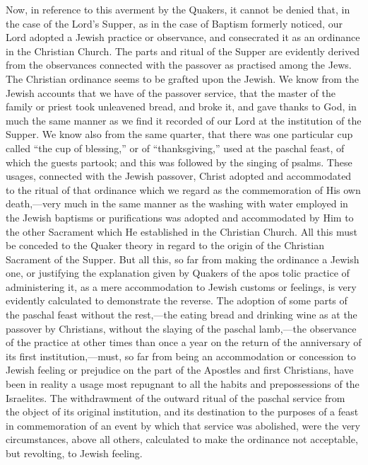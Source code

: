 \documentclass[]{book}
\begin{document}
Now, in reference to this averment by the Quakers, it cannot be denied that, in the case of the Lord's Supper, as in the case of Baptism formerly noticed, our Lord adopted a Jewish practice or observance, and consecrated it as an ordinance in the Christian Church. The parts and ritual of the Supper are evidently derived from the observances connected with the passover as practised among the Jews. The Christian ordinance seems to be grafted upon the Jewish. We know from the Jewish accounts that we have of the passover service, that the master of the family or priest took unleavened bread, and broke it, and gave thanks to God, in much the same manner as we find it recorded of our Lord at the institution of the Supper. We know also from the same quarter, that there was one particular cup called ``the cup of blessing,'' or of ``thanksgiving,'' used at the paschal feast, of which the guests partook; and this was followed by the singing of psalms. These usages, connected with the Jewish passover, Christ adopted and accommodated to the ritual of that ordinance which we regard as the commemoration of His own death,---very much in the same manner as the washing with water employed in the Jewish baptisms or purifications was adopted and accommodated by Him to the other Sacrament which He established in the Christian Church. All this must be conceded to the Quaker theory in regard to the origin of the Christian Sacrament of the Supper. But all this, so far from making the ordinance a Jewish one, or justifying the explanation given by Quakers of the apos tolic practice of administering it, as a mere accommodation to Jewish customs or feelings, is very evidently calculated to demonstrate the reverse. The adoption of some parts of the paschal feast without the rest,---the eating bread and drinking wine as at the passover by Christians, without the slaying of the paschal lamb,---the observance of the practice at other times than once a year on the return of the anniversary of its first institution,---must, so far from being an accommodation or concession to Jewish feeling or prejudice on the part of the Apostles and first Christians, have been in reality a usage most repugnant to all the habits and prepossessions of the Israelites. The withdrawment of the outward ritual of the paschal service from the object of its original institution, and its destination to the purposes of a feast in commemoration of an event by which that service was abolished, were the very circumstances, above all others, calculated to make the ordinance not acceptable, but revolting, to Jewish feeling.
\end{document}
